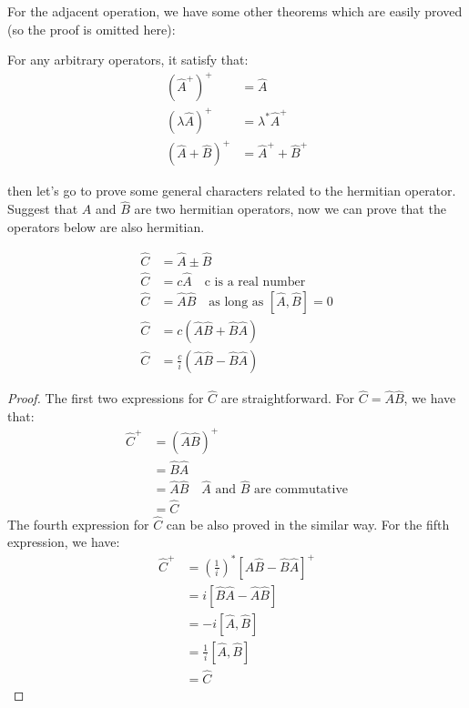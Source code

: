 For the adjacent operation, we have some other theorems which are
easily proved (so the proof is omitted here):
\begin{theorem}
For any arbitrary operators, it satisfy that:
\begin{equation}\label{OPERATOReq:29}
\begin{split}
  (\hat{A}^{+})^{+} &=  \hat{A} \\
   (\lambda\hat{A})^{+} &=  \lambda^{*}\hat{A}^{+} \\
(\hat{A} + \hat{B})^{+} &= \hat{A}^{+} + \hat{B}^{+}
\end{split}
\end{equation}
\end{theorem}

then let's go to prove some general characters related to the
hermitian operator. Suggest that $\hat{A}$ and $\hat{B}$ are two
hermitian operators, now we can prove that the operators below are
also hermitian.
\begin{theorem}
\begin{align}\label{OPERATOReq:30}
\hat{C} &= \hat{A} \pm \hat{B} \nonumber \\
\hat{C} &= c\hat{A} \quad \text{c is a real number} \nonumber \\
\hat{C} &= \hat{A}\hat{B} \quad \text{as long as $[\hat{A}, \hat{B}] = 0$} \nonumber \\
\hat{C} &= c(\hat{A}\hat{B} + \hat{B}\hat{A}) \nonumber \\
\hat{C} &= \frac{c}{i}(\hat{A}\hat{B} - \hat{B}\hat{A})
\end{align}
\end{theorem}

\begin{proof}
The first two expressions for $\hat{C}$ are straightforward. For
$\hat{C} = \hat{A}\hat{B}$, we have that:
\begin{equation}\label{}
\begin{split}
  \hat{C}^{+} &= (\hat{A}\hat{B})^{+}  \\
    &= \hat{B}\hat{A} \\
    &= \hat{A}\hat{B} \quad
    \text{$\hat{A}$ and $\hat{B}$ are commutative} \\
    &= \hat{C}
\end{split}
\end{equation}
The fourth expression for $\hat{C}$ can be also proved in the
similar way. For the fifth expression, we have:
\begin{equation}\label{OPERATOReq:24}
\begin{split}
  \hat{C}^{+} &= \left(\frac{1}{i}\right)^{*}
  [\hat{A}\hat{B} - \hat{B}\hat{A}]^{+}
  \\
    &= i[\hat{B}\hat{A} - \hat{A}\hat{B}] \\
    &=-i[\hat{A},\hat{B}] \\
    &=\frac{1}{i}[\hat{A},\hat{B}] \\
    &=\hat{C}
\end{split}
\end{equation}
 \qedhere
\end{proof}

